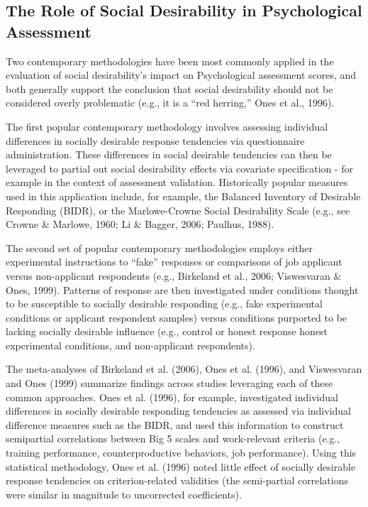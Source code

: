 \documentclass[
  ,jou]{apa6}
\begin{document}
\subsection{The Role of Social Desirability in Psychological Assessment}\label{the-role-of-social-desirability-in-psychological-assessment}

Two contemporary methodologies have been most commonly applied in the evaluation of social desirability's impact on Psychological assessment scores, and both generally support the conclusion that social desirability should not be considered overly problematic (e.g., it is a ``red herring,'' Ones et al., 1996).

The first popular contemporary methodology involves assessing individual differences in socially desirable response tendencies via questionnaire administration. These differences in social desirable tendencies can then be leveraged to partial out social desirability effects via covariate specification - for example in the context of assessment validation. Historically popular measures used in this application include, for example, the Balanced Inventory of Desirable Responding (BIDR), or the Marlowe-Crowne Social Desirability Scale (e.g., see Crowne \& Marlowe, 1960; Li \& Bagger, 2006; Paulhus, 1988).

The second set of popular contemporary methodologies employs either experimental instructions to ``fake'' responses or comparisons of job applicant versus non-applicant respondents (e.g., Birkeland et al., 2006; Viswesvaran \& Ones, 1999). Patterns of response are then investigated under conditions thought to be susceptible to socially desirable responding (e.g., fake experimental conditions or applicant respondent samples) versus conditions purported to be lacking socially desirable influence (e.g., control or honest response honest experimental conditions, and non-applicant respondents).

The meta-analyses of Birkeland et al. (2006), Ones et al. (1996), and Viswesvaran and Ones (1999) summarize findings across studies leveraging each of these common approaches. Ones et al. (1996), for example, investigated individual differences in socially desirable responding tendencies as assessed via individual difference measures such as the BIDR, and used this information to construct semipartial correlations between Big 5 scales and work-relevant criteria (e.g., training performance, counterproductive behaviors, job performance). Using this statistical methodology, Ones et al. (1996) noted little effect of socially desirable response tendencies on criterion-related validities (the semi-partial correlations were similar in magnitude to uncorrected coefficients).
\end{document}
